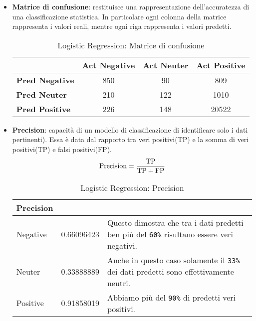 			\begin{itemize}
				\item \textbf{Matrice di confusione}: restituisce una rappresentazione dell'accuratezza di una classificazione statistica. In particolare ogni colonna della matrice rappresenta i valori reali, mentre ogni riga rappresenta i valori predetti.
				
					\begin{table} [H]
						\caption{Logistic Regression: Matrice di confusione}
						\label{tab:matriceConfusioneLogisticRegression}
						\centering
						\begin{tabular}{lccc}
							\toprule 
							& \textbf{Act Negative} & \textbf{Act Neuter}	& \textbf{Act Positive}\\
							\midrule
							\textbf{Pred Negative}  & 850 & 90 & 809\\
							\textbf{Pred Neuter} & 210 & 122 & 1010\\
							\textbf{Pred Positive} & 226 & 148 & 20522\\
							\bottomrule
						\end{tabular}
					\end{table}
			
				\item \textbf{Precision}: capacità di un modello di classificazione di identificare solo i dati pertinenti). Essa è data dal rapporto tra veri positivi(TP) e la somma di veri positivi(TP) e falsi positivi(FP).
					\begin{equation}
					\text{Precision} = \frac{\text{TP}}{\text{TP} + \text{FP}} \\
					\end{equation}
					
					\begin{table} [H]
						\caption{Logistic Regression: Precision}
						\label{tab:precisionLogisticRegression}
						\centering
						\begin{tabular}{llp{}}
							\toprule 
							\textbf{Precision}	\\
							\midrule
							Negative & 0.66096423 & Questo dimostra che tra i dati predetti ben più del \verb|60%| risultano essere veri negativi.\\
							Neuter & 0.33888889 & Anche in questo caso solamente il \verb|33%| dei dati predetti sono effettivamente neutri.\\
							Positive & 0.91858019 & Abbiamo più del \verb|90%| di predetti veri positivi.\\
							\bottomrule
						\end{tabular}
					\end{table}
				

\end{itemize}
